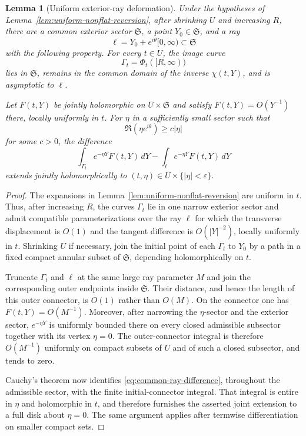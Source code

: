 \documentclass[11pt]{article}
\numberwithin{equation}{section}
\newtheorem{lemma}[lemma]{Lemma}
\theoremstyle{definition}
\theoremstyle{remark}
\newcommand{\eps}{\varepsilon}
\begin{document}
\begin{lemma}[Uniform exterior-ray deformation]\label{lem:nonflat-common-ray}
Under the hypotheses of Lemma~\ref{lem:uniform-nonflat-reversion}, after
shrinking $U$ and increasing $R$, there are a common exterior sector
$\mathfrak S$, a point $Y_0\in\mathfrak S$, and a ray
\[
  \ell=Y_0+e^{i\theta}[0,\infty)\subset\mathfrak S
\]
with the following property.  For every $t\in U$, the image curve
\[
  \Gamma_t=\Phi_t([R,\infty))
\]
lies in $\mathfrak S$, remains in the common domain of the inverse
$\chi(t,Y)$, and is asymptotic to $\ell$.

Let $F(t,Y)$ be jointly holomorphic on $U\times\mathfrak S$ and satisfy
$F(t,Y)=O(Y^{-1})$ there, locally uniformly in $t$.  For $\eta$ in a
sufficiently small sector such that
\[
  \Re(\eta e^{i\theta})\ge c|\eta|
\]
for some $c>0$, the difference
\begin{equation}\label{eq:common-ray-difference}
  \int_{\Gamma_t}e^{-\eta Y}F(t,Y)\,dY
  -\int_{\ell}e^{-\eta Y}F(t,Y)\,dY
\end{equation}
extends jointly holomorphically to $(t,\eta)\in U\times\{|\eta|<\eps\}$.
\end{lemma}

\begin{proof}
The expansions in Lemma~\ref{lem:uniform-nonflat-reversion} are uniform in
$t$.  Thus, after increasing $R$, the curves $\Gamma_t$ lie in one narrow
exterior sector and admit compatible parameterizations over the ray $\ell$
for which the transverse displacement is $O(1)$ and the tangent difference
is $O(|Y|^{-2})$, locally uniformly in $t$.  Shrinking $U$ if necessary,
join the initial point of each $\Gamma_t$ to $Y_0$ by a path in a fixed
compact annular subset of $\mathfrak S$, depending holomorphically on $t$.

Truncate $\Gamma_t$ and $\ell$ at the same large ray parameter $M$ and join
the corresponding outer endpoints inside $\mathfrak S$.  Their distance,
and hence the length of this outer connector, is $O(1)$ rather than $O(M)$.
On the connector one has $F(t,Y)=O(M^{-1})$.  Moreover, after narrowing the
$\eta$-sector and the exterior sector, $e^{-\eta Y}$ is uniformly bounded
there on every closed admissible subsector together with its vertex
$\eta=0$.  The outer-connector integral is therefore $O(M^{-1})$ uniformly
on compact subsets of $U$ and of such a closed subsector, and tends to zero.

Cauchy's theorem now identifies \eqref{eq:common-ray-difference}, throughout
the admissible sector, with the finite initial-connector integral.  That
integral is entire in $\eta$ and holomorphic in $t$, and therefore furnishes
the asserted joint extension to a full disk about $\eta=0$.  The same
argument applies after termwise differentiation on smaller compact sets.
\end{proof}
\end{document}
